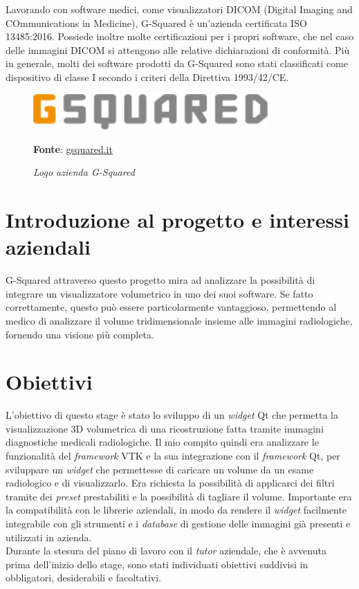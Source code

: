 Lavorando con software medici, come visualizzatori DICOM (Digital Imaging and COmmunications in Medicine), G-Squared è un'azienda certificata ISO 13485:2016. Possiede inoltre molte certificazioni per i propri software, che nel caso delle immagini DICOM si attengono alle relative dichiarazioni di conformità. Più in generale, molti dei software prodotti da G-Squared sono stati classificati come dispositivo di classe I secondo i criteri della Direttiva 1993/42/CE.

\begin{figure}[ht]
    \centering
    \includegraphics[width=0.8\textwidth]{immagini/logo-azienda.png}
    \caption{\textit{Logo azienda G-Squared}}
    \textbf{Fonte}: \href{https://www.gsquared.it/it}{gsquared.it}
    \label{fig: Logo azienda G-Squared}
\end{figure}

\section{Introduzione al progetto e interessi aziendali}
G-Squared attraverso questo progetto mira ad analizzare la possibilità di integrare un visualizzatore volumetrico in uno dei suoi software. Se fatto correttamente, questo può essere particolarmente vantaggioso, permettendo al medico di analizzare il volume tridimensionale insieme alle immagini radiologiche, fornendo una visione più completa.

\section{Obiettivi}\label{sec:descrizione-obiettivi}
L'obiettivo di questo stage è stato lo sviluppo di un \emph{widget} Qt che permetta la visualizzazione 3D volumetrica di una ricostruzione fatta tramite immagini diagnostiche medicali radiologiche. Il mio compito quindi era analizzare le funzionalità del \emph{framework} VTK e la sua integrazione con il \emph{framework} Qt, per sviluppare un \emph{widget} che permettesse di caricare un volume da un esame radiologico e di visualizzarlo. Era richiesta la possibilità di applicarci dei filtri tramite dei \emph{preset} prestabiliti e la possibilità di tagliare il volume.
Importante era la compatibilità con le librerie aziendali, in modo da rendere il \emph{widget} facilmente integrabile con gli strumenti e i \emph{database} di gestione delle immagini già presenti e utilizzati in azienda.
\\
Durante la stesura del piano di lavoro con il \emph{tutor} aziendale, che è avvenuta prima dell'inizio dello stage, sono stati individuati obiettivi suddivisi in obbligatori, desiderabili e facoltativi.

